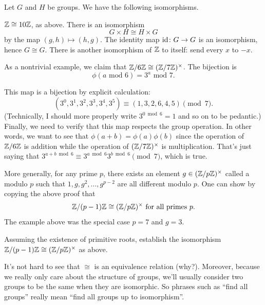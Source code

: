 \begin{example}
	Let $G$ and $H$ be groups. We have the following isomorphisms.
	\begin{enumerate}[(a)]
		\ii $\mathbb Z \cong 10 \mathbb Z$, as above.
		\ii There is an isomorphism
		\[ G \times H \cong H \times G\]
		by the map $(g,h) \mapsto (h,g)$.
		\ii The identity map $\mathrm{id} \colon G \to G$
		is an isomorphism, hence $G \cong G$.
		\ii There is another isomorphism of $\mathbb Z$ to itself: send every $x$ to $-x$.
	\end{enumerate}
\end{example}
\begin{example}
	As a nontrivial example, we claim that $\mathbb Z/6\mathbb Z \cong (\mathbb Z/7\mathbb Z)^\times$.
	The bijection is
	\[ \phi(\text{$a$ mod $6$}) = \text{$3^a$ mod $7$}. \]
	\begin{itemize}
		\ii This map is a bijection by explicit calculation:
		\[ (3^0, 3^1, 3^2, 3^3, 3^4, 3^5)
			\equiv (1,3,2,6,4,5) \pmod 7. \]
		(Technically, I should more properly write $3^{0 \bmod 6} = 1$ and so on to be pedantic.)
		\ii Finally, we need to verify that this map respects the group operation.
		In other words, we want to see that
		$\phi(a+b) = \phi(a) \phi(b)$
		since the operation of $\mathbb Z/6\mathbb Z$ is addition
		while the operation of $(\mathbb Z/7\mathbb Z)^\times$ is multiplication.
		That's just saying that $3^{a+b \bmod 6} \equiv 3^{a \bmod 6} 3^{b \bmod 6} \pmod 7$,
		which is true.
	\end{itemize}
\end{example}
\begin{example}
	More generally, for any prime $p$, there exists
	an element $g \in (\mathbb Z/p\mathbb Z)^\times$ called a  modulo $p$
	such that $1, g, g^2, \dots, g^{p-2}$ are all different modulo $p$.
	One can show by copying the above proof that
	\[ \mathbb Z/(p-1)\mathbb Z \cong (\mathbb Z/p\mathbb Z)^\times \text{ for all primes $p$}. \]
	The example above was the special case $p=7$ and $g=3$.
\end{example}
\begin{exercise}
	Assuming the existence of primitive roots,
	establish the isomorphism $\mathbb Z/(p-1)\mathbb Z \cong (\mathbb Z/p\mathbb Z)^\times$ as above.
\end{exercise}

It's not hard to see that $\cong$ is an equivalence relation (why?).
Moreover, because we really only care about the structure of groups,
we'll usually consider two groups to be the same when they are isomorphic.
So phrases such as ``find all groups'' really mean
``find all groups up to isomorphism''.

